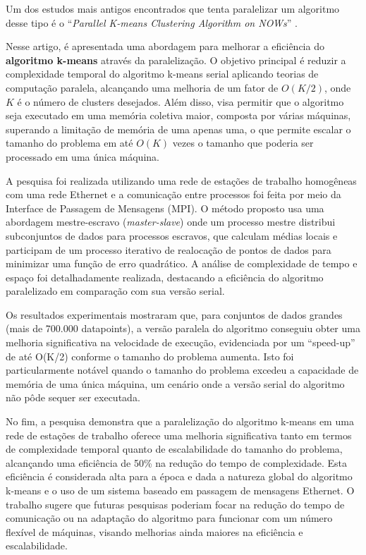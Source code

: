 \documentclass[12pt,
openright, 
oneside, %
a4paper,    %
brazil]{facom-ufu-abntex2}
\begin{document}
Um dos estudos mais antigos encontrados que tenta paralelizar um algoritmo desse tipo é o \enquote{\textit{Parallel K-means Clustering Algorithm on NOWs}} \cite{kMeansParallelkantabutra2000}.

Nesse artigo, é apresentada uma abordagem para melhorar a eficiência do \textbf{algoritmo k-means} através da paralelização. O objetivo principal é reduzir a complexidade temporal do algoritmo k-means serial aplicando teorias de computação paralela, alcançando uma melhoria de um fator de $O(K/2)$, onde $K$ é o número de clusters desejados. Além disso, visa permitir que o algoritmo seja executado em uma memória coletiva maior, composta por várias máquinas, superando a limitação de memória de uma apenas uma, o que permite escalar o tamanho do problema em até $O(K)$ vezes o tamanho que poderia ser processado em uma única máquina.

A pesquisa foi realizada utilizando uma rede de estações de trabalho homogêneas com uma rede Ethernet e a comunicação entre processos foi feita por meio da Interface de Passagem de Mensagens (MPI). O método proposto usa uma abordagem mestre-escravo (\textit{master-slave}) onde um processo mestre distribui subconjuntos de dados para processos escravos, que calculam médias locais e participam de um processo iterativo de realocação de pontos de dados para minimizar uma função de erro quadrático. A análise de complexidade de tempo e espaço foi detalhadamente realizada, destacando a eficiência do algoritmo paralelizado em comparação com sua versão serial.

Os resultados experimentais mostraram que, para conjuntos de dados grandes (mais de 700.000 datapoints), a versão paralela do algoritmo conseguiu obter uma melhoria significativa na velocidade de execução, evidenciada por um \enquote{speed-up} de até O(K/2) conforme o tamanho do problema aumenta. Isto foi particularmente notável quando o tamanho do problema excedeu a capacidade de memória de uma única máquina, um cenário onde a versão serial do algoritmo não pôde sequer ser executada.

No fim, a pesquisa demonstra que a paralelização do algoritmo k-means em uma rede de estações de trabalho oferece uma melhoria significativa tanto em termos de complexidade temporal quanto de escalabilidade do tamanho do problema, alcançando uma eficiência de 50\% na redução do tempo de complexidade. Esta eficiência é considerada alta para a época e dada a natureza global do algoritmo k-means e o uso de um sistema baseado em passagem de mensagens Ethernet. O trabalho sugere que futuras pesquisas poderiam focar na redução do tempo de comunicação ou na adaptação do algoritmo para funcionar com um número flexível de máquinas, visando melhorias ainda maiores na eficiência e escalabilidade.
\end{document}
